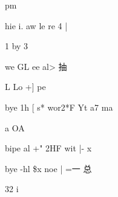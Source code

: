 \documentclass[UTF8,12pt,a4paper,openany]{ctexbook}
\begin{document}
\begin{enumerate}[label=\textbf{\arabic*.},leftmargin=2em]
pm\par hie i.   aw le re 4 |\par 1    by     3\par we GL ee al> 抽\par L          Lo +]       pe\par bye 1h [ s* wor2*F Yt    a7 ma\par a OA\par bipe al +" 2HF wit |- x\par bye -hl \$x noe | =一  总\par 32        i
\end{enumerate}
\end{document}

